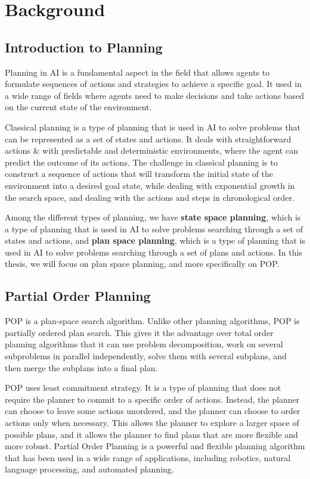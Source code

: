 \chapter{Background}\label{chap:background}

\section{Introduction to Planning}
Planning in \acf{AI} is a fundamental aspect in the field that allows agents to formulate sequences of actions and strategies
to achieve a specific goal. It used in a wide range of fields where agents need to make decisions and take actions based on the
current state of the environment.

Classical planning is a type of planning that is used in \ac{AI} to solve problems that can be represented as a set of states and actions.
It deals with straightforward actions \& with predictable and deterministic environments, where the agent can predict the outcome of its actions.
The challenge in classical planning is to construct a sequence of actions that will transform the initial state
of the environment into a desired goal state, while dealing with exponential growth in the search space, and dealing with the
actions and steps in chronological order.

Among the different types of planning, we have \textbf{state space planning}, which is a type of planning that is used in \ac{AI} to solve
problems searching through a set of states and actions,
and \textbf{plan space planning}, which is a type of planning that is used in \ac{AI} to solve problems searching
through a set of plans and actions. In this thesis, we will focus on plan space planning, and more specifically on \acf{POP}.


\section{Partial Order Planning}
\acf{POP} is a plan-space search algorithm. Unlike other planning algorithms, \ac{POP} is partially ordered plan search.
This gives it the advantage over total order planning algorithms that it can use problem decomposition, work
on several subproblems in parallel independently, solve them with several subplans, and then merge the subplans into a final plan.


\ac{POP} uses least commitment strategy. It is a type of planning that does not require the planner to commit to a specific order of actions.
Instead, the planner can choose to leave some actions unordered, and the planner can choose to order actions only when necessary.
This allows the planner to explore a larger space of possible plans, and it allows the planner to find plans that
are more flexible and more robust. Partial Order Planning is a powerful and flexible planning algorithm that has
been used in a wide range of applications, including robotics, natural language processing, and automated planning.


